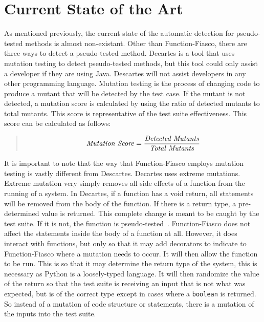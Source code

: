 

\section{Current State of the Art}\label{sec:stateofart}

As mentioned previously, the current state of the automatic detection for pseudo-tested methods is almost non-existant. Other than Function-Fiasco, there are three ways to detect a pseudo-tested method. Decartes is a tool that uses mutation testing to detect pseudo-tested methods, but this tool could only assist a developer if they are using Java. Descartes will not assist developers in any other programming language. Mutation testing is the process of changing code to produce a mutant that will be detected by the test case. If the mutant is not detected, a mutation score is calculated by using the ratio of detected mutants to total mutants. This score is representative of the test suite effectiveness. This score can be calculated as follows:

\begin{quote}
\begin{equation}
\mbox{\emph{Mutation Score}} = \frac{\mbox{\emph{Detected Mutants}}}{\mbox{\emph{Total Mutants}}}
\end{equation}
\end{quote}

It is important to note that the way that Function-Fiasco employs mutation testing is vastly different from Descartes. Decartes uses extreme mutations. Extreme mutation very simply removes all side effects of a function from the running of a system. In Decartes, if a function has a void return, all statements will be removed from the body of the function. If there is a return type, a pre-determined value is returned. This complete change is meant to be caught by the test suite. If it is not, the function is pseudo-tested~\cite{vera2018descartes}. Function-Fiasco does not affect the statements inside the body of a function at all. However, it does interact with functions, but only so that it may add decorators to indicate to Function-Fiasco where a mutation needs to occur. It will then allow the function to be run. This is so that it may determine the return type of the system, this is necessary as Python is a loosely-typed language. It will then randomize the value of the return so that the test suite is receiving an input that is not what was expected, but is of the correct type except in cases where a \texttt{boolean} is returned. So instead of a mutation of code structure or statements, there is a mutation of the inputs into the test suite.

